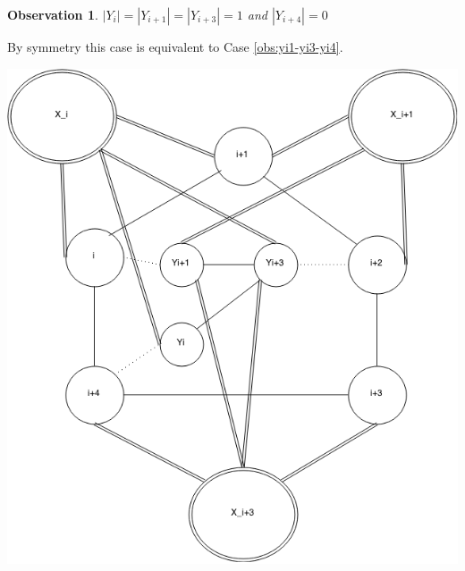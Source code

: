 \documentclass[12pt]{article}
\newtheorem{Observation}[Theorem]{Observation}
\begin{document}
\begin{Observation}\label{obs:yi-yi1-yi3} 
$ |Y_{i}| = |Y_{i+1}| = |Y_{i+3}| = 1$ and $|Y_{i+4}| = 0$
\end{Observation}
\begin{minipage}{0.5\textwidth}%
	 By symmetry this case is equivalent to Case \ref{obs:yi1-yi3-yi4}.
\end{minipage}
\hfill
\begin{minipage}{0.5\textwidth}\raggedleft
	\includegraphics[width=\linewidth]{Yi-Yi1-Yi3.png}
\end{minipage}
\clearpage
\end{document}
